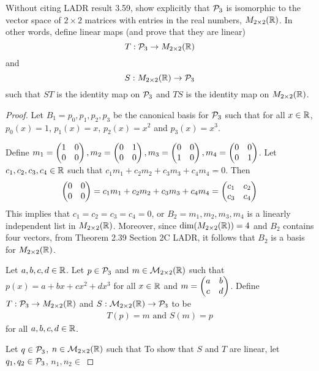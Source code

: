 \begin{question}
\normalfont
\noindent Without citing LADR result 3.59, show explicitly that  $\P_3$ is isomorphic to the vector space of $2\times2$ matrices with entries in the real numbers, $M_{2\times 2}(\real)$. In other words, define linear maps (and prove that they are linear)
\[
T: \P_3 \to M_{2\times2}(\real)
\]
and 
\[
S: M_{2\times2}(\real) \to \P_3
\]
such that $ST$ is the identity map on $\P_3$ and $TS$ is the identity map on $M_{2\times2}(\real)$.  \\ 


\end{question}

\begin{proof}
    \renewcommand{\qedsymbol}{$\blacksquare$}
    Let $B_1=p_0,p_1,p_2,p_3$ be the canonical basis for $\P_3$ such that for all $x\in\R$, $p_0(x)=1$, $p_1(x)=x$, $p_2(x)=x^2$ and $p_3(x)=x^3$.

    Define $m_1=\MatTwoTwo{1}{0}{0}{0},m_2=\MatTwoTwo{0}{1}{0}{0},m_3=\MatTwoTwo{0}{0}{1}{0},m_4=\MatTwoTwo{0}{0}{0}{1}$. Let $c_1,c_2,c_3,c_4\in\R$ such that $c_1m_1+c_2m_2+c_3m_3+c_4m_4=0$. Then 
    \[
        \begin{aligned}
            \MatTwoTwo{0}{0}{0}{0} 
            = c_1m_1+c_2m_2+c_3m_3+c_4m_4
            = \MatTwoTwo{c_1}{c_2}{c_3}{c_4}
        \end{aligned}
    \]
    This implies that $c_1=c_2=c_3=c_4=0$, or $B_2=m_1,m_2,m_3,m_4$ is a linearly independent list in $M_{2\times 2}(\R)$.
    Moreover, since $\dim(M_{2\times 2}(\R))=4$ and $B_2$ contains four vectors, from Theorem 2.39 Section 2C LADR, it follows that $B_2$ is a basis for $M_{2\times 2}(\R)$.
    
    Let $a,b,c,d\in\R$. 
    Let $p\in\P_3$ and $m\in\M_{2\times 2}(\R)$ such that $p(x)=a+bx+cx^2+dx^3$ for all $x\in\R$ and $m=\MatTwoTwo{a}{b}{c}{d}$.
    Define $T:\P_3\to M_{2\times 2}(\R)$ and $S:\M_{2\times 2}(\R)\to\P_3$ to be
    \[
        \begin{aligned}
            T(p)=m \text{ and } S(m)=p
        \end{aligned}
    \]
    for all $a,b,c,d\in\R$.

    Let $q\in\P_3$, $n\in\M_{2\times 2}(\R)$ such that 
    To show that $S$ and $T$ are linear, let $q_1,q_2\in\P_3$, $n_1,n_2\in$
\end{proof}